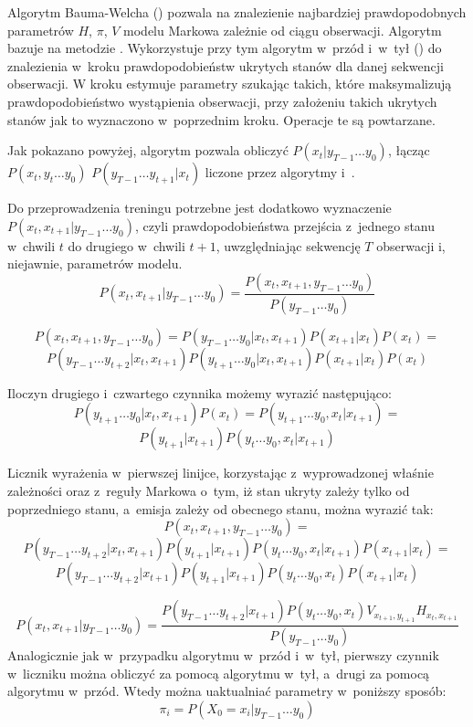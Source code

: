 Algorytm Bauma-Welcha () pozwala na znalezienie najbardziej prawdopodobnych parametrów
$H$, $\pi$, $V$ modelu Markowa zależnie od ciągu obserwacji. Algorytm bazuje na metodzie
. Wykorzystuje przy tym algorytm w~przód i~w~tył ()
do znalezienia w~kroku  prawdopodobieństw ukrytych stanów dla danej sekwencji obserwacji.
W kroku  estymuje parametry szukając takich, które maksymalizują prawdopodobieństwo wystąpienia
obserwacji, przy założeniu takich ukrytych stanów jak to wyznaczono w~poprzednim kroku. Operacje te są powtarzane.

Jak pokazano powyżej, algorytm  pozwala obliczyć $P(x_t | y_{T-1} \dots y_0)$,
łącząc $P(x_t, y_t \dots y_0)$ $P(y_{T-1} \dots y_{t+1} | x_t)$ liczone przez algorytmy  i~.

Do przeprowadzenia treningu  potrzebne jest dodatkowo wyznaczenie $P(x_t, x_{t+1} | y_{T-1} \dots y_0)$,
czyli prawdopodobieństwa przejścia z~jednego stanu w~chwili $t$ do drugiego w~chwili $t + 1$,
uwzględniając sekwencję $T$ obserwacji i, niejawnie, parametrów modelu.
$$P(x_t, x_{t+1} | y_{T-1} \dots y_0)
= \frac{P(x_t, x_{t+1}, y_{T-1} \dots y_0)}{P(y_{T-1} \dots y_0)}$$

$$P(x_t, x_{t+1}, y_{T-1} \dots y_0) = P(y_{T-1} \dots y_0 | x_t, x_{t+1}) P(x_{t+1} | x_t) P(x_t) = $$
$$P(y_{T-1} \dots y_{t+2} | x_t, x_{t+1}) P(y_{t+1} \dots y_0 | x_t, x_{t+1}) P(x_{t+1} | x_t) P(x_t)$$

Iloczyn drugiego i~czwartego czynnika możemy wyrazić następująco:
$$P(y_{t+1} \dots y_0 | x_t, x_{t+1}) P(x_t) = P(y_{t+1} \dots y_0, x_t | x_{t+1}) = $$
$$P(y_{t+1} | x_{t+1}) P(y_t \dots y_0, x_t | x_{t+1})$$

Licznik wyrażenia w~pierwszej linijce, korzystając z~wyprowadzonej właśnie zależności oraz z~reguły Markowa o~tym,
iż stan ukryty zależy tylko od poprzedniego stanu, a~emisja zależy od obecnego stanu, można wyrazić tak:
$$P(x_t, x_{t+1}, y_{T-1} \dots y_0) =$$
$$P(y_{T-1} \dots y_{t+2} | x_t, x_{t+1}) P(y_{t+1} | x_{t+1}) P(y_t \dots y_0, x_t | x_{t+1}) P(x_{t+1} | x_t) =$$
$$P(y_{T-1} \dots y_{t+2} | x_{t+1}) P(y_{t+1} | x_{t+1}) P(y_t \dots y_0, x_t) P(x_{t+1} | x_t)$$

$$P(x_t, x_{t+1} | y_{T-1} \dots y_0)
= \frac{P(y_{T-1} \dots y_{t+2} | x_{t+1}) P(y_t \dots y_0, x_t) V_{x_{t+1}, y_{t+1}} H_{x_t, x_{t+1}}}{P(y_{T-1} \dots y_0)}$$
Analogicznie jak w~przypadku algorytmu w~przód i~w~tył, pierwszy czynnik w~liczniku można obliczyć za pomocą
algorytmu w~tył, a~drugi za pomocą algorytmu w~przód. Wtedy można uaktualniać parametry w~poniższy sposób:
$$\pi_i = P(X_0 = x_i | y_{T-1} \dots y_0)$$

